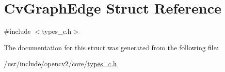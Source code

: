 \hypertarget{structCvGraphEdge}{\section{Cv\-Graph\-Edge Struct Reference}
\label{structCvGraphEdge}
}


{\ttfamily \#include $<$types\-\_\-c.\-h$>$}



The documentation for this struct was generated from the following file\-:\begin{DoxyCompactItemize}
\item 
/usr/include/opencv2/core/\hyperlink{core_2types__c_8h}{types\-\_\-c.\-h}\end{DoxyCompactItemize}
